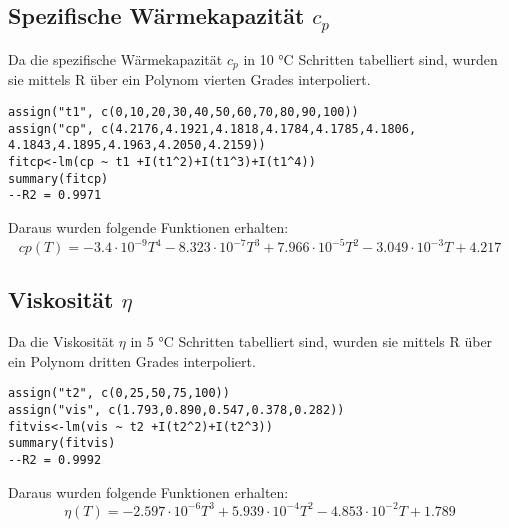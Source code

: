 \documentclass{article}
\begin{document}
\subsection{Spezifische Wärmekapazität $c _p$}
Da die spezifische Wärmekapazität $c _p$ \cite{crc1} in 10 \si{\celsius} Schritten
tabelliert sind, wurden sie mittels R über ein Polynom vierten Grades interpoliert.
\begin{verbatim}
assign("t1", c(0,10,20,30,40,50,60,70,80,90,100))
assign("cp", c(4.2176,4.1921,4.1818,4.1784,4.1785,4.1806,
4.1843,4.1895,4.1963,4.2050,4.2159))
fitcp<-lm(cp ~ t1 +I(t1^2)+I(t1^3)+I(t1^4))
summary(fitcp)
--R2 = 0.9971
\end{verbatim}
Daraus wurden folgende Funktionen erhalten:
\begin{equation}
 cp (T) = -3.4 \cdot 10^{-9} T ^4 -8.323 \cdot 10^{-7} T ^ 3 + 7.966 \cdot 10^{-5} T ^ 2 - 3.049 \cdot 10^{-3} T + 4.217
\end{equation}
\subsection{Viskosität $\eta$}
Da die Viskosität $\eta$ \cite{crc2} in 5 \si{\celsius} Schritten
tabelliert sind, wurden sie mittels R über ein Polynom dritten Grades interpoliert.
\begin{verbatim}
assign("t2", c(0,25,50,75,100))
assign("vis", c(1.793,0.890,0.547,0.378,0.282))
fitvis<-lm(vis ~ t2 +I(t2^2)+I(t2^3))
summary(fitvis)
--R2 = 0.9992
\end{verbatim}
Daraus wurden folgende Funktionen erhalten:
\begin{equation}
 \eta (T) = -2.597 \cdot 10^{-6} T ^ 3 + 5.939 \cdot 10^{-4} T ^ 2 - 4.853 \cdot 10^{-2} T + 1.789
\end{equation}
\end{document}
